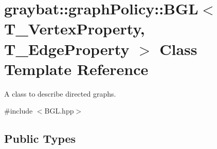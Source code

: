 \hypertarget{classgraybat_1_1graphPolicy_1_1BGL}{}\section{graybat\+:\+:graph\+Policy\+:\+:B\+G\+L$<$ T\+\_\+\+Vertex\+Property, T\+\_\+\+Edge\+Property $>$ Class Template Reference}
\label{classgraybat_1_1graphPolicy_1_1BGL}


A class to describe directed graphs.  




{\ttfamily \#include $<$B\+G\+L.\+hpp$>$}

\subsection*{Public Types}
